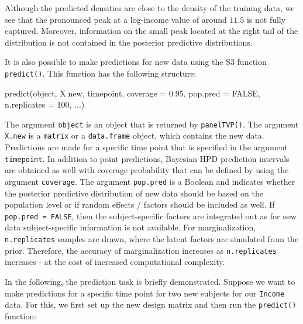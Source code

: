 \documentclass[a4paper, preprint, 3p,
authoryear]{elsarticle} %
\newenvironment{Shaded}{\begin{snugshade}}{\end{snugshade}}
\newcommand{\NormalTok}[1]{#1}
\begin{document}
Although the predicted densities are close to the density of the
training data, we see that the pronounced peak at a log-income value of
around \(11.5\) is not fully captured. Moreover, information on the
small peak located at the right tail of the distribution is not
contained in the posterior predictive distributions.

It is also possible to make predictions for new data using the S3
function \texttt{predict()}. This function has the following structure:

\begin{Shaded}
\begin{Highlighting}[]
\NormalTok{predict(object, X.new, timepoint, coverage = 0.95,}
\NormalTok{        pop.pred = FALSE, n.replicates = 100, ...)}
\end{Highlighting}
\end{Shaded}

The argument \texttt{object} is an object that is returned by
\texttt{panelTVP()}. The argument \texttt{X.new} is a \texttt{matrix} or
a \texttt{data.frame} object, which contains the new data. Predictions
are made for a specific time point that is specified in the argument
\texttt{timepoint}. In addition to point predictions, Bayesian HPD
prediction intervals are obtained as well with coverage probability that
can be defined by using the argument \texttt{coverage}. The argument
\texttt{pop.pred} is a Boolean and indicates whether the posterior
predictive distribution of new data should be based on the population
level or if random effects / factors should be included as well. If
\texttt{pop.pred = FALSE}, then the subject-specific factors are
integrated out as for new data subject-specific information is not
available. For marginalization, \texttt{n.replicates} samples are drawn,
where the latent factors are simulated from the prior. Therefore, the
accuracy of marginalization increases as \texttt{n.replicates} increases
- at the cost of increased computational complexity.

In the following, the prediction task is briefly demonstrated. Suppose
we want to make predictions for a specific time point for two new
subjects for our \texttt{Income} data. For this, we first set up the new
design matrix and then run the \texttt{predict()} function:
\end{document}
